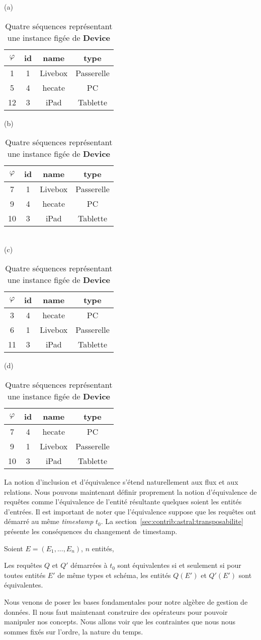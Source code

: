 \begin{table}[ht]
\centering
(a)
\begin{tabular}{c|ccc} 
      $\varphi$ & id & name & type \\ \hline 
       1  & 1 & Livebox & Passerelle \\
       5  & 4 & hecate & PC\\
       12 & 3 & iPad & Tablette\\
\end{tabular}
\hspace{1cm}
(b)
\begin{tabular}{c|ccc} 
      $\varphi$ & id & name & type \\ \hline 
       7  & 1 & Livebox & Passerelle \\
       9  & 4 & hecate & PC\\
       10 & 3 & iPad & Tablette\\
\end{tabular}\\
(c)
\begin{tabular}{c|ccc} 
      $\varphi$ & id & name & type \\ \hline 
       3  & 4 & hecate & PC\\
       6  & 1 & Livebox & Passerelle \\
       11 & 3 & iPad & Tablette\\
\end{tabular}
\hspace{1cm}
(d)
\begin{tabular}{c|ccc} 
      $\varphi$ & id & name & type \\ \hline 
       7  & 4 & hecate & PC\\
       9  & 1 & Livebox & Passerelle \\
       10 & 3 & iPad & Tablette\\
\end{tabular}
\caption{Quatre séquences représentant une instance figée de \textbf{Device}}\label{tab:contrib:astral:exequivalence}
\end{table}

La notion d'inclusion et d'équivalence s'étend naturellement aux flux et aux relations. Nous pouvons maintenant définir proprement la notion d'équivalence de requêtes comme l'équivalence de l'entité résultante quelques soient les entités d'entrées. Il est important de noter que l'équivalence suppose que les requêtes ont démarré au même \textit{timestamp} $t_0$. La section~\ref{sec:contrib:astral:transposabilite} présente les conséquences du changement de timestamp.
\begin{defi}\label{def:equivalence}
	Soient $E=(E_1, ..., E_n)$, $n$ entités,
	
	Les requêtes $Q$ et $Q'$ démarrées à $t_0$ sont équivalentes si et seulement si pour toutes entités $E'$ de même types et schéma, les entités $Q(E')$ et $Q'(E')$ sont équivalentes.
\end{defi}



Nous venons de poser les bases fondamentales pour notre algèbre de gestion de données. Il nous faut maintenant construire des opérateurs pour pouvoir manipuler nos concepts. Nous allons voir que les contraintes que nous nous sommes fixés sur l'ordre, la nature du temps.
